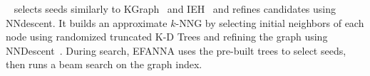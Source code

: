  ~\cite{efanna} selects seeds similarly to KGraph~\cite{kgraph} and IEH~\cite{ieh} and refines candidates using NNdescent. It builds an approximate $k$-NNG by selecting initial neighbors of each node using randomized truncated K-D Trees \cite{dasgupta2008random} and refining the graph using NNDescent~\cite{nndescent}. 
During search, EFANNA uses the pre-built trees to select seeds, then
runs a beam search on the graph index.


